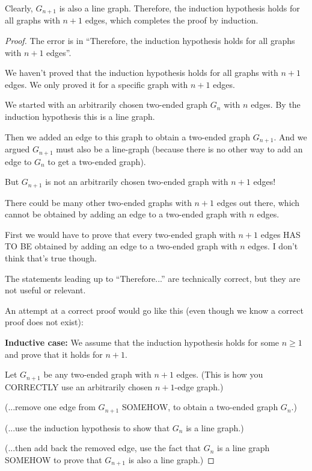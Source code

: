 \documentclass[14pt]{extarticle}
\begin{document}
Clearly, $G_{n+1}$ is also a line graph. Therefore, the induction hypothesis holds for all graphs with $n + 1$ edges, which completes the proof by induction.
\begin{proof}
The error is in ``Therefore, the induction hypothesis holds for all graphs with $n + 1$ edges''.

We haven't proved that the induction hypothesis holds for all graphs with $n+1$ edges. We only proved it for a specific graph with $n+1$ edges.

We started with an arbitrarily chosen two-ended graph $G_n$ with $n$ edges. By the induction hypothesis this is a line graph.

Then we added an edge to this graph to obtain a two-ended graph $G_{n+1}$. And we argued $G_{n+1}$ must also be a line-graph (because there is no other way to add an edge to $G_n$ to get a two-ended graph).

But $G_{n+1}$ is not an arbitrarily chosen two-ended graph with $n+1$ edges!

There could be many other two-ended graphs with $n+1$ edges out there, which cannot be obtained by adding an edge to a two-ended graph with $n$ edges.

First we would have to prove that every two-ended graph with $n+1$ edges HAS TO BE obtained by adding an edge to a two-ended graph with $n$ edges. I don't think that's true though.

The statements leading up to ``Therefore...'' are technically correct, but they are not useful or relevant.

An attempt at a correct proof would go like this (even though we know a correct proof does not exist):

{\bf Inductive case:} We assume that the induction hypothesis holds for some $n \geq 1$ and prove that it holds for $n + 1$.

Let $G_{n+1}$ be any two-ended graph with $n+1$ edges. (This is how you CORRECTLY use an arbitrarily chosen $n+1$-edge graph.) 

(...remove one edge from $G_{n+1}$ SOMEHOW, to obtain a two-ended graph $G_n$.)

(...use the induction hypothesis to show that $G_n$ is a line graph.)

(...then add back the removed edge, use the fact that $G_n$ is a line graph SOMEHOW to prove that $G_{n+1}$ is also a line graph.)
\end{proof}
\end{document}
